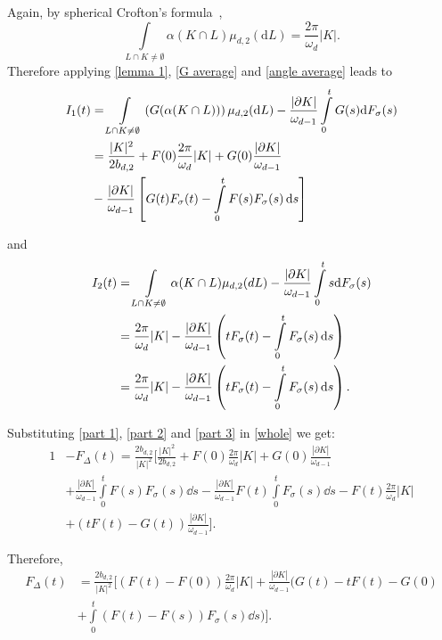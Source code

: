 \documentclass[12pt, reqno]{amsart}
\begin{document}
Again, by spherical Crofton's formula~\cite[Section~6.5]{SW08},
\begin{equation}\label{angle average}
    \int\limits_{L \cap K \neq \emptyset}\alpha(K \cap L)\mu_{d,2}(\mathrm{d}L)=\frac{2\pi}{\omega_d}|K|.
\end{equation}
Therefore applying \eqref{lemma 1}, \eqref{G average} and \eqref{angle average} leads to
\begin{align}\notag
    I_1(t) &= \int\limits_{L \cap K \neq \emptyset}\left(G(\alpha(K \cap L))\right)\mu_{d,2}(\mathrm{d}L) - \frac{|\partial K|}{\omega_{d-1}}\int\limits_0^t G(s)\mathrm{d}F_{\sigma}(s) \\\notag
    & = \frac{|K|^2}{2b_{d,2}} + F(0)\frac{2\pi}{\omega_d}|K| + G(0)\frac{|\partial K|}{\omega_{d-1}} \\ \label{part 1}
    &- \frac{|\partial K|}{\omega_{d-1}}\left[G(t)F_{\sigma}(t) - \int\limits_0^tF(s)F_{\sigma}(s){\,\rm d} s \right]
\end{align}

and
\begin{align}\notag
    I_2(t) &= \int\limits_{L \cap K \neq \emptyset}\alpha(K \cap L)\mu_{d,2}(dL) - \frac{|\partial K|}{\omega_{d-1}}\int\limits_0^t s\mathrm{d}F_{\sigma}(s) \\ \notag
    &= \frac{2\pi}{\omega_d}|K| - \frac{|\partial K|}{\omega_{d-1}}\left(tF_{\sigma}(t) - \int\limits_0^t F_{\sigma}(s){\,\rm d} s\right)  \\ \label{part 2}
    &= \frac{2\pi}{\omega_d}|K| - \frac{|\partial K|}{\omega_{d-1}}\left(tF_{\sigma}(t) - \int\limits_0^t F_{\sigma}(s){\,\rm d} s\right).
\end{align}

Substituting \eqref{part 1}, \eqref{part 2} and \eqref{part 3} in \eqref{whole} we get:
\begin{align*}
    1 &- F_{\Delta}(t) = \frac{2b_{d,2}}{|K|^2}\Bigg[\frac{|K|^2}{2b_{d,2}} + F(0)\frac{2\pi}{\omega_d}|K| + G(0)\frac{|\partial K|}{\omega_{d-1}}\\
    &+ \frac{|\partial K|}{\omega_{d-1}}\int\limits_0^t F(s)F_{\sigma}(s)\dd s - \frac{|\partial K|}{\omega_{d-1}}F(t)\int\limits_0^tF_{\sigma}(s)\dd s - F(t) \frac{2\pi}{\omega_d}|K| \\
    & + \left(tF(t) - G(t)\right)\frac{|\partial K|}{\omega_{d-1}}\Bigg].
\end{align*}



Therefore, 
\begin{align*}
   F_{\Delta}(t) &= \frac{2b_{d,2}}{|K|^2}\Bigg[\left(F(t) - F(0)\right) \frac{2\pi}{\omega_d}|K|  +  \frac{|\partial K|}{\omega_{d-1}} \Bigg(G(t) - tF(t) - G(0) \\
   &  + \int\limits_0^t\left(F(t) - F(s)\right)F_{\sigma}(s)\dd s\Bigg)\Bigg].
\end{align*}
\end{document}

